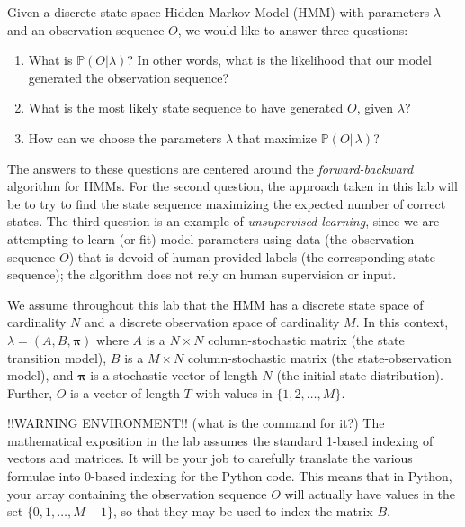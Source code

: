 \label{lab:hmm}

Given a discrete state-space Hidden Markov Model (HMM) with parameters $\lambda$ and an observation sequence $O$, we would like to answer three questions:
\begin{enumerate}
 \item What is $\mathbb{P}(O | \lambda)$? In other words, what is the likelihood that our model generated the observation sequence?
 \item What is the most likely state sequence to have generated $O$, given $\lambda$?
 \item How can we choose the parameters $\lambda$ that maximize $\mathbb{P}(O | \, \lambda)$?
\end{enumerate}
The answers to these questions are centered around the \emph{forward-backward} algorithm for HMMs. 
For the second question, the approach taken in this lab will be to try to find the state sequence maximizing the expected number of correct states.
The third question is an example of \emph{unsupervised learning}, since we are attempting to learn (or fit) model parameters using data (the observation sequence $O$) that is devoid
of human-provided labels (the corresponding state sequence); the algorithm does not rely on human supervision or input.

We assume throughout this lab that the HMM has a discrete state space of cardinality $N$ and a discrete observation space of cardinality $M$. 
In this context, $\lambda = \left( A, B, \mathbf{\pi} \right)$ where $A$ is a $N \times N$  column-stochastic matrix (the state transition model), $B$ is a $M \times N$ column-stochastic matrix (the
state-observation model), and $\mathbf{\pi}$ is a stochastic vector of length $N$ (the initial state distribution).
Further, $O$ is a vector of length $T$ with values in $\{1,2,\ldots,M\}$.

!!WARNING ENVIRONMENT!! (what is the command for it?)
The mathematical exposition in the lab assumes the standard 1-based indexing of vectors and matrices.
It will be your job to carefully translate the various formulae into 0-based indexing for the Python code.
This means that in Python, your array containing the observation sequence $O$ will actually have values
in the set $\{0,1,\ldots,M-1\}$, so that they may be used to index the matrix $B$.

